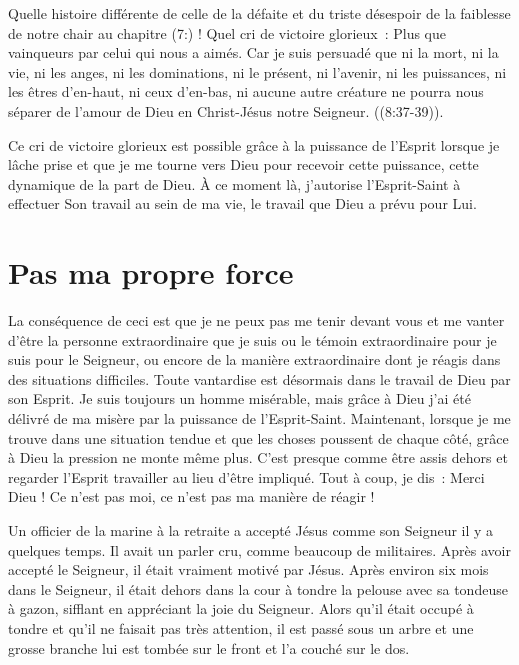 Quelle histoire différente de celle de la défaite et du triste désespoir
 de la faiblesse de notre chair au chapitre (7:) !
 Quel cri de victoire glorieux~:
 \og Plus que vainqueurs par celui qui nous a aimés.
 Car je suis persuadé que ni la mort, ni la vie, ni les anges,
 ni les dominations, ni le présent, ni l'avenir, ni les puissances,
 ni les êtres d'en-haut, ni ceux d'en-bas, ni aucune autre créature
 ne pourra nous séparer de l'amour de Dieu en Christ-Jésus
 notre Seigneur. \fg{} ((8:37-39)).

Ce cri de victoire glorieux est possible grâce à la puissance de l'Es\-prit
 lorsque je lâche prise et que je me tourne vers Dieu pour recevoir
 cette puissance, cette dynamique de la part de Dieu. À ce moment là,
 j'autorise l'Esprit-Saint à effectuer Son travail au sein de ma vie,
 le travail que Dieu a prévu pour Lui.


\section*{Pas ma propre force}

La conséquence de ceci est que je ne peux pas me tenir devant vous
 et me vanter d'être la personne extraordinaire que je suis
 ou le témoin extraordinaire pour je suis pour le Seigneur,
 ou encore de la manière extraordinaire dont je réagis dans des
 situations difficiles.
 Toute vantardise est désormais dans le travail de Dieu par son Esprit.
 Je suis toujours un homme misérable, mais grâce à Dieu
 j'ai été délivré de ma misère par la puissance de l'Esprit-Saint.
 Maintenant, lorsque je me trouve dans une situation tendue
 et que les choses poussent de chaque côté, grâce à Dieu la pression
 ne monte même plus.
 C'est presque comme être assis dehors et regarder l'Esprit travailler
 au lieu d'être impliqué.
 Tout à coup, je dis~:
 \og Merci Dieu ! Ce n'est pas moi,
 ce n'est pas ma manière de réagir ! \fg{}

Un officier de la marine à la retraite a accepté Jésus comme son Seigneur
 il y a quelques temps.
 Il avait un parler cru, comme beaucoup de militaires.
 Après avoir accepté le Seigneur, il était vraiment motivé par Jésus.
 Après environ six mois dans le Seigneur, il était dehors dans la cour
 à tondre la pelouse avec sa tondeuse à gazon, sifflant en appréciant
 la joie du Seigneur.
 Alors qu'il était occupé à tondre et qu'il ne faisait pas très attention,
 il est passé sous un arbre et une grosse branche lui est tombée sur le front
 et l'a couché sur le dos.

